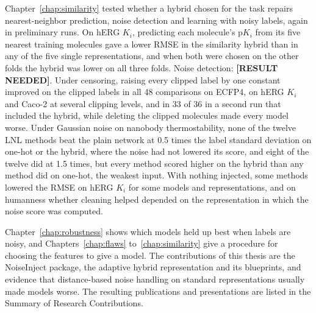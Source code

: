 Chapter~\ref{chap:similarity} tested whether a hybrid chosen for the task repairs nearest-neighbor prediction, noise detection and learning with noisy labels, again in preliminary runs. On hERG $K_i$, predicting each molecule's p$K_i$ from its five nearest training molecules gave a lower RMSE in the similarity hybrid than in any of the five single representations, and when both were chosen on the other folds the hybrid was lower on all three folds. Noise detection: \textbf{[RESULT NEEDED]}. Under censoring, raising every clipped label by one constant improved on the clipped labels in all 48 comparisons on ECFP4, on hERG $K_i$ and Caco-2 at several clipping levels, and in 33 of 36 in a second run that included the hybrid, while deleting the clipped molecules made every model worse. Under Gaussian noise on nanobody thermostability, none of the twelve LNL methods beat the plain network at 0.5 times the label standard deviation on one-hot or the hybrid, where the noise had not lowered its score, and eight of the twelve did at 1.5 times, but every method scored higher on the hybrid than any method did on one-hot, the weakest input. With nothing injected, some methods lowered the RMSE on hERG $K_i$ for some models and representations, and on humanness whether cleaning helped depended on the representation in which the noise score was computed.


Chapter~\ref{chap:robustness} shows which models held up best when labels are noisy, and Chapters~\ref{chap:flaws} to~\ref{chap:similarity} give a procedure for choosing the features to give a model. The contributions of this thesis are the NoiseInject package, the adaptive hybrid representation and its blueprints, and evidence that distance-based noise handling on standard representations usually made models worse. The resulting publications and presentations are listed in the Summary of Research Contributions.



